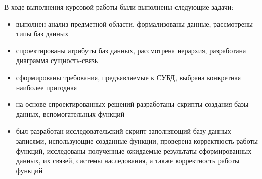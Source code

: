 
В ходе выполнения курсовой работы были выполнены следующие задачи:
\begin{itemize}
  \item 
  выполнен анализ предметной области, формализованы данные, рассмотрены типы баз данных
  \item 
  спроектированы атрибуты баз данных, рассмотрена иерархия, разработана диаграмма сущность-связь
  \item 
  сформированы требования, предъявляемые к СУБД, выбрана конкретная наиболее пригодная
  \item 
  на основе спроектированных решений разработаны скрипты создания базы данных, вспомогательных функций
  \item 
  был разработан исследовательский скрипт заполняющий базу данных записями, использующие созданные функции, проверена корректность работы функций, исследованы полученные ожидаемые результаты сформированных данных, их связей, системы наследования, а также корректность работы функций
\end{itemize}
